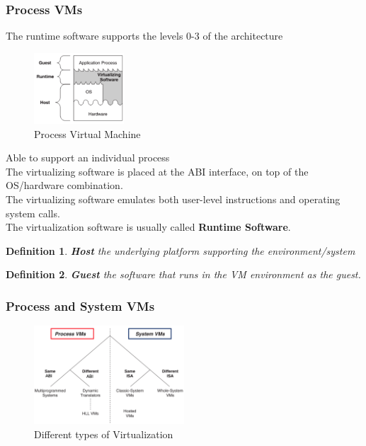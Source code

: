 \documentclass[10pt, oneside]{article}
\newtheorem{defn}{Definition}
\begin{document}
\subsubsection{Process VMs}
The runtime software supports the levels 0-3 of the architecture
\begin{multicols}{2}
    \begin{figure}[H]
        \begin{center}
        \includegraphics[width=0.3\textwidth]{img/img33.png}
        \caption{Process Virtual Machine}
        \label{fig:Process VMs}
        \end{center}
    \end{figure}
    \columnbreak
    Able to support an individual process\\ The virtualizing software is placed at the ABI interface, on top of the OS/hardware combination.\\ The virtualizing software emulates both user-level instructions and operating system calls.\\ The virtualization software is usually called {\bf Runtime Software}.
\end{multicols}
\begin{defn}
    {\bf Host} the underlying platform supporting the environment/system
\end{defn}
\begin{defn}
    {\bf Guest} the software that runs in the VM environment as the guest.
\end{defn}
\subsubsection{Process and System VMs}
\begin{figure}[H]
    \begin{center}
    \includegraphics[width=0.5\textwidth]{img/img34.png}
    \caption{Different types of Virtualization}
    \label{fig:types of virtualization}
    \end{center}
\end{figure}
\end{document}

